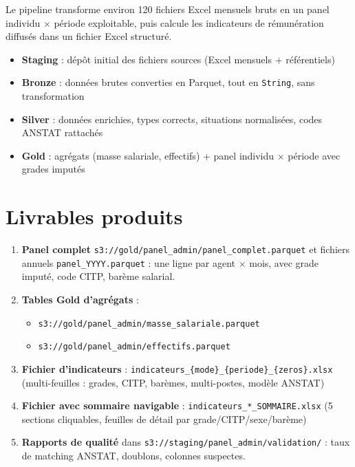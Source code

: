 \documentclass[12pt,a4paper,french]{report}
\newcommand{\bucket}[1]{\texttt{s3://#1}}
\begin{document}
Le pipeline transforme environ 120 fichiers Excel mensuels bruts en un panel
individu $\times$ période exploitable, puis calcule les indicateurs de
rémunération diffusés dans un fichier Excel structuré.

\begin{infobox}
  \begin{itemize}[nosep]
    \item \textbf{Staging} : dépôt initial des fichiers sources (Excel mensuels +
          référentiels)
    \item \textbf{Bronze} : données brutes converties en Parquet, tout en
          \texttt{String}, sans transformation
    \item \textbf{Silver} : données enrichies, types corrects, situations
          normalisées, codes ANSTAT rattachés
    \item \textbf{Gold} : agrégats (masse salariale, effectifs) + panel
          individu $\times$ période avec grades imputés
  \end{itemize}
\end{infobox}

\section{Livrables produits}

\begin{enumerate}
  \item \textbf{Panel complet} \bucket{gold/panel\_admin/panel\_complet.parquet}
        et fichiers annuels \texttt{panel\_YYYY.parquet} : une ligne par
        agent $\times$ mois, avec grade imputé, code CITP, barème salarial.

  \item \textbf{Tables Gold d'agrégats} :
        \begin{itemize}[nosep]
          \item \bucket{gold/panel\_admin/masse\_salariale.parquet}
          \item \bucket{gold/panel\_admin/effectifs.parquet}
        \end{itemize}

  \item \textbf{Fichier d'indicateurs} : \texttt{indicateurs\_\{mode\}\_\{periode\}\_\{zeros\}.xlsx}
        (multi-feuilles : grades, CITP, barèmes, multi-postes, modèle ANSTAT)

  \item \textbf{Fichier avec sommaire navigable} : \texttt{indicateurs\_*\_SOMMAIRE.xlsx}
        (5 sections cliquables, feuilles de détail par grade/CITP/sexe/barème)

  \item \textbf{Rapports de qualité} dans \bucket{staging/panel\_admin/validation/} :
        taux de matching ANSTAT, doublons, colonnes suspectes.
\end{enumerate}
\end{document}

